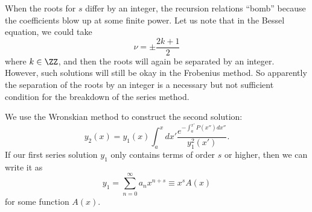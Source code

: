 When the roots for $s$ differ by an integer, the recursion relations ``bomb'' because the coefficients blow up at some finite power. Let us note that in the Bessel equation, we could take
\begin{equation}
    \nu=\pm \frac{2k+1}{2}
\end{equation}
where $k\in \ZZ$, and then the roots will again be separated by an integer. However, such solutions will still be okay in the Frobenius method. So apparently the separation of the roots by an integer is a necessary but not sufficient condition for the breakdown of the series method.

We use the Wronskian method to construct the second solution:
\begin{equation}\label{wronskisecondsolution}
    y_2(x) = y_1(x) \int_a^x dx' \frac{e^{-\int_a^{x'} P(x'')dx''}}{y_1^2(x')}.
\end{equation}
If our first series solution $y_1$ only contains terms of order $s$ or higher, then we can write it as
\begin{equation}
    y_1 = \sum_{n=0}^\infty a_n x^{n+s} \equiv x^s A(x)
\end{equation}
for some function $A(x)$.

